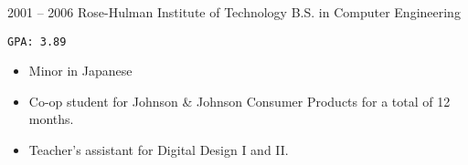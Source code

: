 \documentclass[10pt, letterpaper]{developercv}
\begin{document}

\begin{entrylist}
    \entry
        {2001 -- 2006}
        {Rose-Hulman Institute of Technology}
        {B.S. in Computer Engineering}
        {%
            \texttt{GPA: 3.89}
            \begin{itemize}[nosep]
                \item Minor in Japanese
                \item Co-op student for Johnson \& Johnson Consumer Products
                    for a total of 12 months.
                \item Teacher's assistant for Digital Design I and II.
            \end{itemize}
        }
\end{entrylist}
\end{document}
